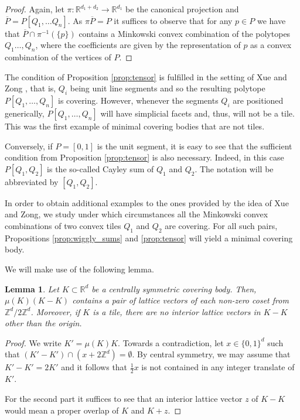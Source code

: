 \documentclass[11pt, a4paper]{amsart}
\newcommand{\RR}{\mathbb{R}}
\newcommand{\ZZ}{\mathbb{Z}}
\numberwithin{equation}{section}
\theoremstyle{plain}
\newtheorem{lemma}[theorem]{Lemma}
\begin{document}
\begin{proof}
Again, let $\pi \colon \RR^{d_1 + d_2} \to \RR^{d_1}$ be the canonical projection and $\overline P = P[Q_1,\dots Q_n]$. As $\pi\overline P = P$ it suffices to observe that for any $p\in P$ we have that $\overline P \cap \pi^{-1}(\{p\})$ contains a Minkowski convex combination of the polytopes $Q_1\dots, Q_n$, where the coefficients are given by the representation of $p$ as a convex combination of the vertices of $P$.
\end{proof}

The condition of Proposition \ref{prop:tensor} is fulfilled in the setting of Xue and Zong \cite{xuezong}, that is, $Q_i$ being unit line segments and so the resulting polytope $P[Q_1,\dots,Q_n]$ is covering. However, whenever the segments $Q_i$ are positioned generically, $P[Q_1,\dots,Q_n]$ will have simplicial facets and, thus, will not be a tile.
This was the first example of minimal covering bodies that are not tiles. 

Conversely, if $P=[0,1]$ is the unit segment, it is easy to see that the sufficient condition from Proposition \ref{prop:tensor} is also necessary. Indeed, in this case $P[Q_1,Q_2]$ is the so-called Cayley sum of $Q_1$ and $Q_2$. The notation will be abbreviated by $[Q_1,Q_2]$. 

In order to obtain additional examples to the ones provided by the idea of Xue and Zong, we study under which circumstances all the Minkowski convex combinations of two convex tiles $Q_1$ and $Q_2$ are covering. For all such pairs, Propositions \ref{prop:wiggly_sums} and \ref{prop:tensor} will yield a minimal covering body. 

We will make use of the following lemma.

\begin{lemma}
\label{lemma:parity}
Let $K\subset\RR^d$ be a centrally symmetric covering body. Then, $\mu(K)(K-K)$ contains a pair of lattice vectors of each non-zero coset from $\ZZ^d/2\ZZ^d$. Moreover, if $K$ is a tile, there are no interior lattice vectors in $K-K$ other than the origin.
\end{lemma}

\begin{proof}
We write $K' = \mu(K)K$. Towards a contradiction, let $x\in\{0,1\}^d$ such that $(K'-K')\cap (x+2\ZZ^d) = \emptyset$. By central symmetry, we may assume that $K'-K'=2K'$ and it follows that $\tfrac 12 x$ is not contained in any integer translate of $K'$. 

For the second part it suffices to see that an interior lattice vector $z$ of $K-K$ would mean a proper overlap of $K$ and $K+z$.
\end{proof}
\end{document}

